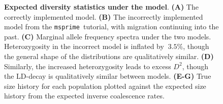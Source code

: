 \documentclass{article}
\newcommand{\msprime}[0]{\texttt{msprime}}
\begin{document}



\pagebreak

\begin{figure}[ht]
\begin{center}
\caption{\textbf{Expected diversity statistics under the \citet{gutenkunst2009inferring} model}.
    \textbf{(A)} The correctly implemented model.
    \textbf{(B)} The incorrectly implemented model from the \msprime\ tutorial, with migration continuing
    into the past.
    \textbf{(C)} Marginal allele frequency spectra under the two models. Heterozygosity in the incorrect model
    is inflated by $~3.5\%$, though the general shape of the distributions are qualitatively similar.
    \textbf{(D)} Similarly, the increased heterozygosity leads to excess $D^2$, though the LD-decay is
    qualitatively similar between models.
    \textbf{(E-G)} True size history for each population plotted against the expected size history from
    the expected inverse coalescence rates.
}
\label{fig:ooa_stats}
\end{center}
\end{figure}
\end{document}
